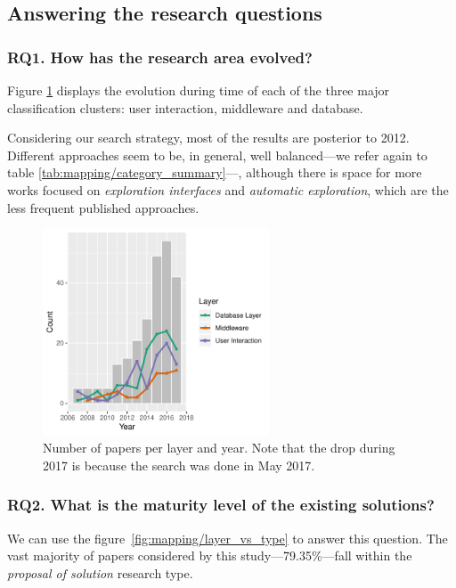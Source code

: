 \subsection{Answering the research questions}
\label{sec:mapping/answers}

\subsubsection{RQ1. How has the research area evolved?}
Figure \ref{fig:mapping/layers_histogram} displays the evolution during time
of each of the three major classification clusters: user interaction,
middleware and database.

Considering our search strategy, most of the
results are posterior to 2012. Different approaches seem to be, in general, well
balanced---we refer again to table \ref{tab:mapping/category_summary}---, although there
is space for more works focused on \emph{exploration interfaces} and
\emph{automatic exploration}, which are the less frequent published approaches.

\begin{figure}[hptb]
    \centering
    \includegraphics[width=0.6\textwidth]{images/3_mapping/layer_histogram}
    \caption[Number of studies per  layer and year]{
        Number of papers per layer and year.
        Note that the drop during 2017 is because the search was done in May 2017.
    }
    \label{fig:mapping/layers_histogram}
\end{figure}

\subsubsection{RQ2. What is the maturity level of the existing solutions?}
We can use the figure~\ref{fig:mapping/layer_vs_type} to answer this question.
The vast majority of papers considered by this study---79.35\%---fall within the
\emph{proposal of solution} research type.

